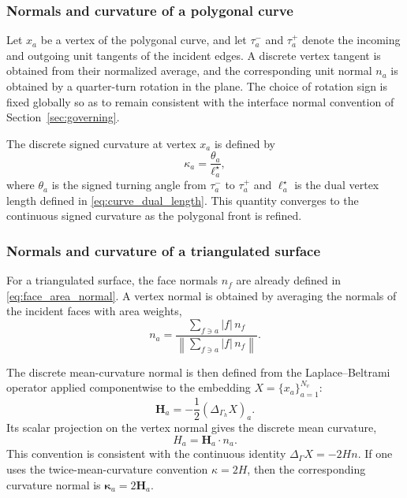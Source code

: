 \documentclass{article}
\begin{document}
\subsubsection{Normals and curvature of a polygonal curve}

Let $x_a$ be a vertex of the polygonal curve, and let $\tau_a^-$ and $\tau_a^+$ denote
the incoming and outgoing unit tangents of the incident edges.
A discrete vertex tangent is obtained from their normalized average, and the
corresponding unit normal $n_a$ is obtained by a quarter-turn rotation in the plane.
The choice of rotation sign is fixed globally so as to remain consistent with
the interface normal convention of Section~\ref{sec:governing}.

The discrete signed curvature at vertex $x_a$ is defined by
\begin{equation}
\kappa_a
=
\frac{\theta_a}{\ell_a^\star},
\label{eq:curve_curvature}
\end{equation}
where $\theta_a$ is the signed turning angle from $\tau_a^-$ to $\tau_a^+$ and
$\ell_a^\star$ is the dual vertex length defined in \eqref{eq:curve_dual_length}.
This quantity converges to the continuous signed curvature as the polygonal front is refined.

\subsubsection{Normals and curvature of a triangulated surface}

For a triangulated surface, the face normals $n_f$ are already defined in
\eqref{eq:face_area_normal}. A vertex normal is obtained by averaging the normals
of the incident faces with area weights,
\begin{equation}
n_a
=
\frac{
\sum\limits_{f\ni a} |f|\,n_f
}{
\left\|
\sum\limits_{f\ni a} |f|\,n_f
\right\|
}.
\label{eq:vertex_normal_surface}
\end{equation}

The discrete mean-curvature normal is then defined from the Laplace--Beltrami
operator applied componentwise to the embedding $X=\{x_a\}_{a=1}^{N_v}$:
\begin{equation}
\boldsymbol{H}_a
=
-\frac12\left(\Delta_{\Gamma_h} X\right)_a.
\label{eq:mean_curvature_vector}
\end{equation}
Its scalar projection on the vertex normal gives the discrete mean curvature,
\begin{equation}
H_a = \boldsymbol{H}_a \cdot n_a.
\label{eq:mean_curvature_scalar}
\end{equation}
This convention is consistent with the continuous identity
$\Delta_\Gamma X = -2H n$. If one uses the twice-mean-curvature convention
$\kappa=2H$, then the corresponding curvature normal is
$\boldsymbol{\kappa}_a=2\boldsymbol{H}_a$.
\end{document}
